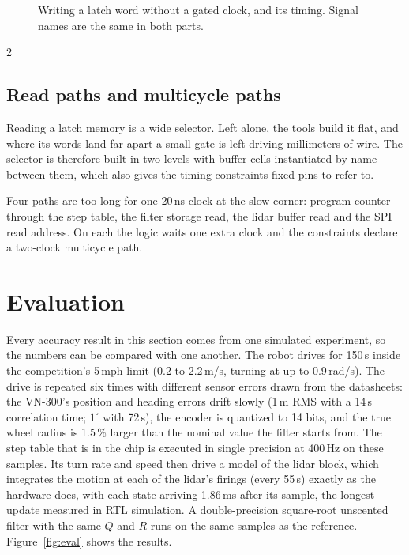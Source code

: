 \documentclass[10pt,letterpaper]{article}
\begin{document}
\begin{figure}[H]
  \caption{Writing a latch word without a gated clock, and its timing.
  Signal names are the same in both parts.}
  \label{fig:latch}
\end{figure}
\begin{multicols}{2}

  \subsection{Read paths and multicycle paths}

  Reading a latch memory is a wide selector.
  Left alone, the tools build it flat, and where its words land far apart a small gate is left driving millimeters of wire.
  The selector is therefore built in two levels with buffer cells instantiated by name between them, which also gives the timing constraints fixed pins to refer to.

  Four paths are too long for one 20\,ns clock at the slow corner: program counter through the step table, the filter storage read, the lidar buffer read and the SPI read address.
  On each the logic waits one extra clock and the constraints declare a two-clock multicycle path.

  \section{Evaluation}
  \label{sec:eval}

  Every accuracy result in this section comes from one simulated experiment, so the numbers can be compared with one another.
  The robot drives for 150\,s inside the competition's 5\,mph limit (0.2 to 2.2\,m/s, turning at up to 0.9\,rad/s).
  The drive is repeated six times with different sensor errors drawn from the datasheets: the VN-300's position and heading errors drift slowly (1\,m RMS with a 14\,s correlation time; $1^\circ$ with 72\,s), the encoder is quantized to 14 bits, and the true wheel radius is 1.5\,\% larger than the nominal value the filter starts from.
  The step table that is in the chip is executed in single precision at 400\,Hz on these samples.
  Its turn rate and speed then drive a model of the lidar block, which integrates the motion at each of the lidar's firings (every 55\,\textmu s) exactly as the hardware does, with each state arriving 1.86\,ms after its sample, the longest update measured in RTL simulation.
  A double-precision square-root unscented filter with the same $Q$ and $R$ runs on the same samples as the reference.
  Figure~\ref{fig:eval} shows the results.

\end{multicols}
\end{document}
